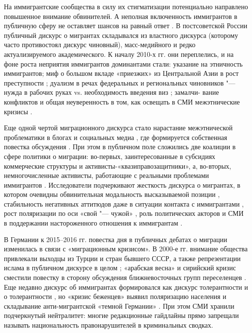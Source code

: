 На иммигрантские сообщества в силу их стигматизации потенциально направлено повышенное внимание обвинителей. А неполная включенность иммигрантов в публичную сферу \cite{Zvereva2014} не оставляет шансов на равный ответ \cite{BleichBloemraadDeGraauw}. В постсоветской России публичный дискурс о мигрантах складывался из властного дискурса (которому часто противостоял дискурс чиновный), масс-медийного и редко актуализируемого академического. К началу 2010-х гг. они переплелись, и на фоне роста неприятия иммигрантов \cite{Bessudnov} доминантами стали: указание на этничность иммигрантов; миф о большом вкладе «приезжих» из Центральной Азии в рост преступности \cite{Mukomel}; дуализм в речах федеральных и региональных чиновников "--- нужда в рабочих руках vs. необходимость введения виз \cite{BodrunovaKoltsovaKoltcov}; замалчи- вание конфликтов и общая неуверенность в том, как освещать в СМИ межэтнические кризисы \cite{HutchinsonTolz}.

Еще одной чертой миграционного дискурса стало нарастание межэтнической проблематики в блогах и социальных медиа \cite{BodrunovaLitvinenkoBlekanov2017}, где формируется собственная повестка обсуждения \cite{Mukomel,ApishevKoltcovKoltsova16}. При этом в публичном поле сложились две коалиции в сфере политики о миграции: во-первых, заинтересованные в субсидиях коммерческие структуры и активисты-«квазиправозащитники», а, во-вторых, немногочисленные активисты, работающие с реальными проблемами иммигрантов \cite{Kondakov}. Исследователи подчеркивают жесткость дискурса о мигрантах, в котором очевидны обвинительная модальность высказываемой позиции \cite{VikulovaSerebrennikova}, стабильность негативных аттитюдов даже в ситуации контакта с иммигрантами \cite{Sokolov}, рост поляризации по оси «свой "--- чужой» \cite{Mukomel2014}, роль политических акторов и СМИ в поддержании настороженного отношения к иммигрантам \cite{KugaiKovaleva,HutchinsonTolz}.

В Германии к 2015--2016 гг. повестка дня в публичных дебатах о миграции изменилась в связи с «миграционным кризисом». В 2000-е гг. внимание общества привлекали выходцы из Турции и стран бывшего СССР, а также репрезентации ислама в публичном дискурсе в целом \cite{BonfadelliMoser}; «арабская весна» и сирийский кризис сместили повестку в сторону обсуждения ближневосточных групп переселенцев \cite{HolmesCastaneda}. Еще недавно дискурс об иммигрантах формировался как дискурс толерантности и о толерантности \cite{Didenko}, но «кризис беженцев» выявил поляризацию населения и складывание анти-мигрантской «темной Германии» \cite{BodrunovaLitvinenkoBlekanov2017,SchelterKunegis}. При этом СМИ хранили подчеркнутый нейтралитет: многие редакционные гайдлайны прямо запрещали называть национальность правонарушителей в криминальных сводках.

